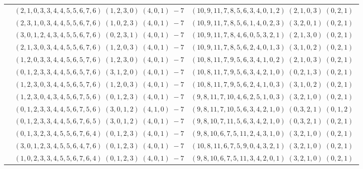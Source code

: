\documentclass[11pt]{article}
\begin{document}
\begin{longtable}[l]{|c|c|c|}
 \cline{2-3} 
 & $(2 ,1 ,0 ,3 ,3 ,4 ,4 ,5 ,5 ,6 ,7 ,6) \;(1 ,2 ,3 ,0) \;(4 ,0 ,1) \;-7$ & $(10 ,9 ,11 ,7 ,8 ,5 ,6 ,3 ,4 ,0 ,1 ,2) \;(2 ,1 ,0 ,3) \;(0 ,2 ,1) \;$\\ 
 \cline{2-3} 
 & $(2 ,3 ,1 ,0 ,3 ,4 ,4 ,5 ,5 ,6 ,7 ,6) \;(1 ,0 ,2 ,3) \;(4 ,0 ,1) \;-7$ & $(10 ,9 ,11 ,7 ,8 ,5 ,6 ,1 ,4 ,0 ,2 ,3) \;(3 ,2 ,0 ,1) \;(0 ,2 ,1) \;$\\ 
 \cline{2-3} 
 & $(3 ,0 ,1 ,2 ,4 ,3 ,4 ,5 ,5 ,6 ,7 ,6) \;(0 ,2 ,3 ,1) \;(4 ,0 ,1) \;-7$ & $(10 ,9 ,11 ,7 ,8 ,4 ,6 ,0 ,5 ,3 ,2 ,1) \;(2 ,1 ,3 ,0) \;(0 ,2 ,1) \;$\\ 
 \cline{2-3} 
 & $(2 ,1 ,3 ,0 ,3 ,4 ,4 ,5 ,5 ,6 ,7 ,6) \;(1 ,2 ,0 ,3) \;(4 ,0 ,1) \;-7$ & $(10 ,9 ,11 ,7 ,8 ,5 ,6 ,2 ,4 ,0 ,1 ,3) \;(3 ,1 ,0 ,2) \;(0 ,2 ,1) \;$\\ 
 \cline{2-3} 
 & $(1 ,2 ,0 ,3 ,3 ,4 ,4 ,5 ,6 ,5 ,7 ,6) \;(1 ,2 ,3 ,0) \;(4 ,0 ,1) \;-7$ & $(10 ,8 ,11 ,7 ,9 ,5 ,6 ,3 ,4 ,1 ,0 ,2) \;(2 ,1 ,0 ,3) \;(0 ,2 ,1) \;$\\ 
 \cline{2-3} 
 & $(0 ,1 ,2 ,3 ,3 ,4 ,4 ,5 ,6 ,5 ,7 ,6) \;(3 ,1 ,2 ,0) \;(4 ,0 ,1) \;-7$ & $(10 ,8 ,11 ,7 ,9 ,5 ,6 ,3 ,4 ,2 ,1 ,0) \;(0 ,2 ,1 ,3) \;(0 ,2 ,1) \;$\\ 
 \cline{2-3} 
 & $(1 ,2 ,3 ,0 ,3 ,4 ,4 ,5 ,6 ,5 ,7 ,6) \;(1 ,2 ,0 ,3) \;(4 ,0 ,1) \;-7$ & $(10 ,8 ,11 ,7 ,9 ,5 ,6 ,2 ,4 ,1 ,0 ,3) \;(3 ,1 ,0 ,2) \;(0 ,2 ,1) \;$\\ 
 \cline{2-3} 
 & $(1 ,2 ,3 ,0 ,4 ,3 ,4 ,5 ,6 ,7 ,5 ,6) \;(0 ,1 ,2 ,3) \;(4 ,0 ,1) \;-7$ & $(9 ,8 ,11 ,7 ,10 ,4 ,6 ,2 ,5 ,1 ,0 ,3) \;(3 ,2 ,1 ,0) \;(0 ,2 ,1) \;$\\ 
 \cline{2-3} 
 & $(0 ,1 ,2 ,3 ,3 ,4 ,4 ,5 ,6 ,7 ,5 ,6) \;(3 ,0 ,1 ,2) \;(4 ,1 ,0) \;-7$ & $(9 ,8 ,11 ,7 ,10 ,5 ,6 ,3 ,4 ,2 ,1 ,0) \;(0 ,3 ,2 ,1) \;(0 ,1 ,2) \;$\\ 
 \cline{2-3} 
 & $(0 ,1 ,2 ,3 ,3 ,4 ,4 ,5 ,6 ,7 ,6 ,5) \;(3 ,0 ,1 ,2) \;(4 ,0 ,1) \;-7$ & $(9 ,8 ,10 ,7 ,11 ,5 ,6 ,3 ,4 ,2 ,1 ,0) \;(0 ,3 ,2 ,1) \;(0 ,2 ,1) \;$\\ 
 \cline{2-3} 
 & $(0 ,1 ,3 ,2 ,3 ,4 ,5 ,5 ,6 ,7 ,6 ,4) \;(0 ,1 ,2 ,3) \;(4 ,0 ,1) \;-7$ & $(9 ,8 ,10 ,6 ,7 ,5 ,11 ,2 ,4 ,3 ,1 ,0) \;(3 ,2 ,1 ,0) \;(0 ,2 ,1) \;$\\ 
 \cline{2-3} 
 & $(3 ,0 ,1 ,2 ,3 ,4 ,5 ,5 ,6 ,4 ,7 ,6) \;(0 ,1 ,2 ,3) \;(4 ,0 ,1) \;-7$ & $(10 ,8 ,11 ,6 ,7 ,5 ,9 ,0 ,4 ,3 ,2 ,1) \;(3 ,2 ,1 ,0) \;(0 ,2 ,1) \;$\\ 
 \cline{2-3} 
 & $(1 ,0 ,2 ,3 ,3 ,4 ,5 ,5 ,6 ,7 ,6 ,4) \;(0 ,1 ,2 ,3) \;(4 ,0 ,1) \;-7$ & $(9 ,8 ,10 ,6 ,7 ,5 ,11 ,3 ,4 ,2 ,0 ,1) \;(3 ,2 ,1 ,0) \;(0 ,2 ,1) \;$\\ 

\end{longtable}
\end{document}
